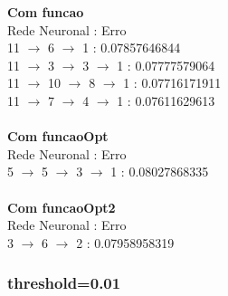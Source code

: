 \documentclass{article}
\begin{document}
\textbf{Com funcao}\\
Rede Neuronal : Erro\\
11 $\to$ 6 $\to$ 1 : 0.07857646844\\
11 $\to$ 3 $\to$ 3 $\to$ 1 : 0.07777579064\\
11 $\to$ 10 $\to$ 8 $\to$ 1 : 0.07716171911\\
11 $\to$ 7 $\to$ 4 $\to$ 1 : 0.07611629613\\
\\
\textbf{Com funcaoOpt}\\
Rede Neuronal : Erro\\
5 $\to$ 5 $\to$ 3 $\to$ 1 : 0.08027868335\\
\\
\textbf{Com funcaoOpt2}\\
Rede Neuronal : Erro\\
3 $\to$ 6 $\to$ 2 : 0.07958958319\\

\subsubsection{threshold=0.01}
\end{document}
